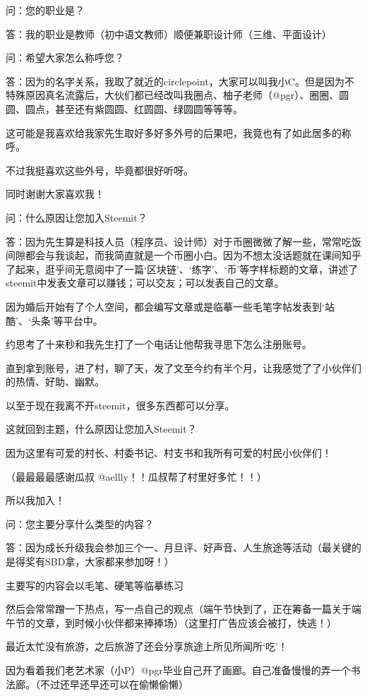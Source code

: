 \documentclass[]{ctexbook}
\begin{document}
问：您的职业是？

答：我的职业是教师（初中语文教师）顺便兼职设计师（三维、平面设计）

问：希望大家怎么称呼您？

答：因为的名字关系，我取了就近的circlepoint，大家可以叫我小C。但是因为不特殊原因真名流露后，大伙们都已经改叫我圈点、柚子老师（@pgr）、圈圈、圆圆、圆点，甚至还有紫圆圆、红圆圆、绿圆圆等等等。

这可能是我喜欢给我家先生取好多好多外号的后果吧，我竟也有了如此居多的称呼。

不过我挺喜欢这些外号，毕竟都很好听呀。

同时谢谢大家喜欢我！

问：什么原因让您加入Steemit？

答：因为先生算是科技人员（程序员、设计师）对于币圈微微了解一些，常常吃饭间隙都会与我谈起，而我简直就是一个币圈小白。因为不想太没话题就在课间知乎了起来，逛乎间无意阅中了一篇`区块链'、`练字'、`币'等字样标题的文章，讲述了steemit中发表文章可以赚钱；可以交友；可以发表自己的文章。

因为婚后开始有了个人空间，都会编写文章或是临摹一些毛笔字帖发表到`站酷'、`头条'等平台中。

约思考了十来秒和我先生打了一个电话让他帮我寻思下怎么注册账号。

直到拿到账号，进了村，聊了天，发了文至今约有半个月，让我感觉了了小伙伴们的热情、好助、幽默。

以至于现在我离不开steemit，很多东西都可以分享。

这就回到主题，什么原因让您加入Steemit？

因为这里有可爱的村长、村委书记、村支书和我所有可爱的村民小伙伴们！

（最最最最感谢瓜叔 @aellly！！瓜叔帮了村里好多忙！！）

所以我加入！

问：您主要分享什么类型的内容？

答：因为成长升级我会参加三个一、月旦评、好声音、人生旅途等活动（最关键的是得奖有SBD拿，大家都来参加呀！）

主要写的内容会以毛笔、硬笔等临摹练习

然后会常常蹭一下热点，写一点自己的观点（端午节快到了，正在筹备一篇关于端午节的文章，到时候小伙伴都来捧捧场）（这里打广告应该会被打，快逃！）

最近太忙没有旅游，之后旅游了还会分享旅途上所见所闻所`吃'！

因为看着我们老艺术家（小P）@pgr毕业自己开了画廊。自己准备慢慢的弄一个书法廊。（不过还早还早还可以在偷懒偷懒）
\end{document}
